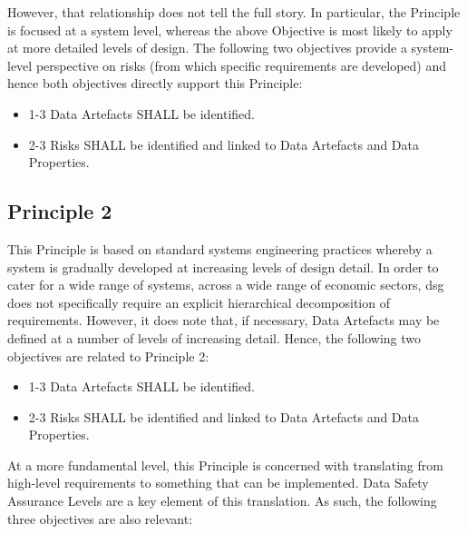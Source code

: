 However, that relationship does not tell the full story. In particular, the Principle is focused at a system level, whereas the above Objective is most likely to apply at more detailed levels of design. The following two objectives provide a system-level perspective on risks (from which specific requirements are developed) and hence both objectives directly support this Principle:

\begin{itemize}
	\item \textcolor{dsiwgAccentColour}{1-3} Data Artefacts SHALL be identified.
	\item \textcolor{dsiwgAccentColour}{2-3} Risks SHALL be identified and linked to Data Artefacts and Data Properties.
\end{itemize}


\subsection{Principle 2}

This Principle is based on standard systems engineering practices whereby a system is gradually developed at increasing levels of design detail. In order to cater for a wide range of systems, across a wide range of economic sectors, \gls{dsg} does not specifically require an explicit hierarchical decomposition of requirements. However, it does note that, if necessary, Data Artefacts may be defined at a number of levels of increasing detail. Hence, the following two objectives are related to Principle 2:

\begin{itemize}
	\item \textcolor{dsiwgAccentColour}{1-3} Data Artefacts SHALL be identified.
	\item \textcolor{dsiwgAccentColour}{2-3} Risks SHALL be identified and linked to Data Artefacts and Data Properties.
\end{itemize}

At a more fundamental level, this Principle is concerned with translating from high-level requirements to something that can be implemented. Data Safety Assurance Levels are a key element of this translation. As such, the following three objectives are also relevant:

